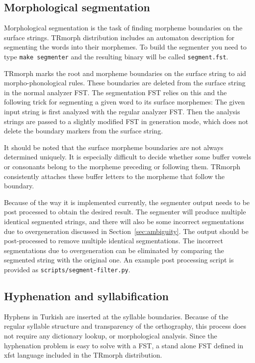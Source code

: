\documentclass[twocolumn]{article}
\begin{document}
\subsection{Morphological segmentation}

Morphological segmentation is the task of finding morpheme boundaries
on the surface strings. TRmorph distribution includes an automaton
description for segmenting the words into their morphemes.  To build
the segmenter you need to type \lstinline{make segmenter} and the
resulting binary will be called \lstinline{segment.fst}.

TRmorph marks the root and morpheme boundaries on the surface string
to aid morpho-phonological rules. These boundaries are deleted from
the surface string in the normal analyzer FST. The segmentation FST
relies on this and the following trick for segmenting a given word to
its surface morphemes: The given input string is first analyzed with
the regular analyzer FST. Then the analysis strings are passed to a
slightly modified FST in generation mode, which does not delete the
boundary markers from the surface string. 

It should be noted that the surface morpheme boundaries are not always
determined uniquely. It is especially difficult to decide whether some
buffer vowels or consonants belong to the morpheme preceding or
following them. TRmorph consistently attaches these buffer letters to
the morpheme that follow the boundary.

Because of the way it is implemented currently, the segmenter output needs to be post
processed to obtain the desired result. The segmenter will produce
multiple identical segmented strings, and there will also be some
incorrect segmentations due to overgeneration discussed in
Section~\ref{sec:ambiguity}. The output should be post-processed to
remove multiple identical segmentations.
The incorrect segmentations due to 
overgeneration can be eliminated by comparing the segmented string
with the original one. An example post processing script is provided
as \lstinline{scripts/segment-filter.py}.


\subsection{Hyphenation and syllabification}

Hyphens in Turkish are inserted at the syllable boundaries.  Because
of the regular syllable structure and transparency of the orthography,
this process does not require any dictionary lookup, or morphological
analysis. Since the hyphenation problem is easy to solve with a FST, a
stand alone FST defined in xfst language included in the TRmorph
distribution.
\end{document}
